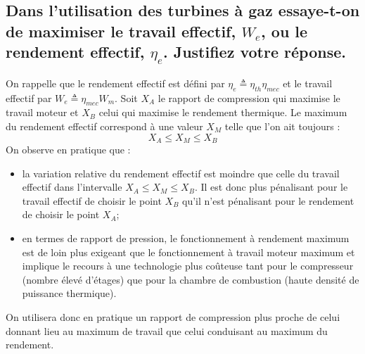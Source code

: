 \subsection{Dans l'utilisation des turbines à gaz essaye-t-on de maximiser le travail effectif, $W_e$, ou le rendement effectif, $\eta_e$. Justifiez votre réponse.}
On rappelle que le rendement effectif est défini par $\eta_e \triangleq \eta_{th}\eta_{mec}$ et le travail effectif par $W_e \triangleq \eta_{mec}W_m$.
Soit $X_A$ le rapport de compression qui maximise le travail moteur et $X_B$ celui qui maximise le rendement thermique. Le maximum du rendement effectif correspond à une valeur $X_M$ telle que l'on ait toujours :
\begin{equation} X_A \leq X_M \leq X_B \end{equation} 
On observe en pratique que :
\begin{itemize}
\item la variation relative du rendement effectif est moindre que celle du travail effectif dans l'intervalle $X_A \leq X_M \leq X_B$. Il est donc plus pénalisant pour le travail effectif de choisir le point $X_B$ qu'il n'est pénalisant pour le rendement de choisir le point $X_A$;
\item en termes de rapport de pression, le fonctionnement à rendement maximum est de loin plus exigeant que le fonctionnement à travail moteur maximum et implique le recours à une technologie plus coûteuse tant pour le compresseur (nombre élevé d'étages) que pour la chambre de combustion (haute densité de puissance thermique).
\end{itemize}
On utilisera donc en pratique un rapport de compression plus proche de celui donnant lieu au maximum de travail que celui conduisant au maximum du rendement.

